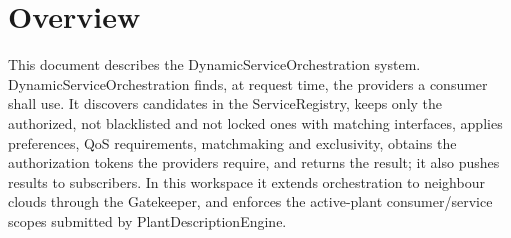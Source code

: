 \documentclass[a4paper]{arrowhead}
\begin{document}
\sloppy

\ArrowheadSetup

\begin{center}
  \vspace*{1cm}
  \huge{\arrowtitle}

  \vspace*{0.2cm}
  \LARGE{\arrowtype}
  \vspace*{1cm}

  \vspace*{\fill}


  \vspace*{1cm}
  \vspace*{\fill}

  \begin{abstract}
    This document describes the DynamicServiceOrchestration core system of the Eclipse Arrowhead 5.2.2 framework, as implemented in Java Spring in \texttt{ah5-core-java-spring/serviceorchestration-dynamic}, including the local extensions of this workspace.
  \end{abstract}

  \vspace*{1cm}
\end{center}

\newpage

\tableofcontents
\newpage

\section{Overview}
\label{sec:overview}

This document describes the DynamicServiceOrchestration system. Dynamic\allowbreak{}Service\allowbreak{}Orchestration finds, at request time, the providers a consumer shall use. It discovers candidates in the ServiceRegistry, keeps only the authorized, not blacklisted and not locked ones with matching interfaces, applies preferences, QoS requirements, matchmaking and exclusivity, obtains the authorization tokens the providers require, and returns the result; it also pushes results to subscribers. In this workspace it extends orchestration to neighbour clouds through the Gatekeeper, and enforces the active-plant consumer/service scopes submitted by Plant\allowbreak{}Description\allowbreak{}Engine.
\end{document}
